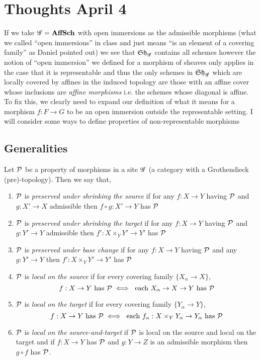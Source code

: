 \documentclass[12pt]{article}
\begin{document}
\newcommand{\PSh}{\mathrm{PSh}}

\section{Thoughts April 4}

If we take $\mathscr{G} = \mathbf{AffSch}$ with open immersions as the admissible morphisms (what we called ``open immersions'' in class and just means ``is an element of a covering family'' as Daniel pointed out) we see that $\mathfrak{Sh}_{\mathscr{G}}$ contains all schemes however the notion of ``open immersion'' we defined for a morphism of sheaves only applies in the case that it is representable and thus the only schemes in $\mathfrak{Sh}_{\mathscr{G}}$ which are locally covered by affines in the induced topology are those with an affine cover whose inclusions are \textit{affine morphisms} i.e. the schemes whose diagonal is affine. 
\bigskip\\
To fix this, we clearly need to expand our definition of what it means for a morphism $f : F \to G$ to be an open immersion outside the representable setting. I will consider some ways to define properties of non-representable morphisms 

\subsection{Generalities}

\begin{defn}
Let $\mathcal{P}$ be a property of morphisms in a site $\mathscr{G}$ (a category with a Grothendieck (pre)-topology). Then we say that,
\begin{enumerate}
\item $\mathcal{P}$ is \textit{preserved under shrinking the source} if for any $f : X \to Y$ having $\mathcal{P}$ and $g : X' \to X$ admissible then $f \circ g : X' \to Y$ has $\mathcal{P}$
\item $\mathcal{P}$ is \textit{preserved under shrinking the target} if for any $f : X \to Y$ having $\mathcal{P}$ and $g : Y' \to Y$ admissible then $f' : X \times_Y Y' \to Y'$ has $\mathcal{P}$
\item $\mathcal{P}$ is \textit{preserved under base change} if for any $f : X \to Y$ having $\mathcal{P}$ and any $g : Y' \to Y$ then $f' : X \times_Y Y' \to Y'$ has $\mathcal{P}$
\item $\mathcal{P}$ is \textit{local on the source} if for every covering family $\{ X_\alpha \to X\}$,
\[ f : X \to Y \text{ has } \mathcal{P} \iff \text{ each } X_\alpha \to X \to Y \text{ has } \mathcal{P} \]
\item $\mathcal{P}$ is \textit{local on the target} if for every covering family $\{ Y_\alpha \to Y \}$,
\[ f : X \to Y \text{ has } \mathcal{P} \iff \text{ each } f_\alpha : X \times_Y Y_\alpha \to Y_\alpha \text{ has } \mathcal{P} \]
\item $\mathcal{P}$ is \textit{local on the source-and-target} if $\mathcal{P}$ is local on the source and local on the target and if $f : X \to Y$ has $\mathcal{P}$ and $g : Y \to Z$ is an admissible morphism  then $g \circ f$ has $\mathcal{P}$.
\end{enumerate}
\end{defn}
\end{document}
